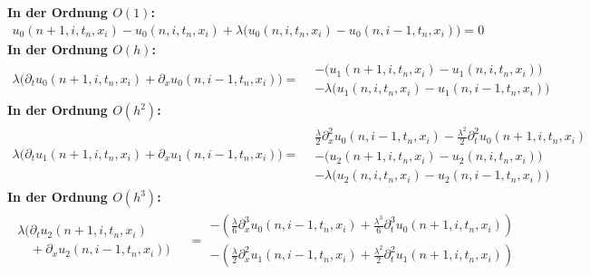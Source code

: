 \vspace{0.4cm}
\noindent \textbf{In der Ordnung $O(1)$:}
\begin{align}\label{eq:transport:diskret:o1}
u_0(n+1, i, t_n, x_i) - u_0(n, i, t_n, x_i)
+ \lambda \bigl(u_0(n, i, t_n, x_i) - u_0(n, i-1, t_n, x_i) \bigr) = 0
\end{align}
\vspace{0.4cm}
\noindent \textbf{In der Ordnung $O(h)$:}
\begin{align}\label{eq:transport:diskret:oh}
\lambda \bigl( \partial_t u_0(n+1, i, t_n, x_i) + \partial_x u_0(n, i-1, t_n, x_i) \bigr) =
\begin{split}
&- \bigl( u_1(n+1, i, t_n, x_i) - u_1(n, i, t_n, x_i) \bigr)\\
&- \lambda \bigl(u_1(n, i, t_n, x_i) - u_1(n, i-1, t_n, x_i) \bigr)
\end{split}
\end{align}
\vspace{0.4cm}
\noindent \textbf{In der Ordnung $O(h^2)$:}
\begin{align}\label{eq:transport:diskret:oh2}
\lambda \bigl( \partial_t u_1(n+1, i, t_n, x_i) + \partial_x u_1(n, i-1, t_n, x_i) \bigr) =
\begin{split}
&\frac {\lambda}{2} \partial^2_x u_0(n, i-1, t_n, x_i) - \frac{\lambda^2}{2} \partial^2_t u_0(n+1, i, t_n, x_i)\\
&- \bigl( u_2(n+1, i, t_n, x_i) - u_2(n, i, t_n, x_i) \bigr)\\
&- \lambda \bigl(u_2(n, i, t_n, x_i) - u_2(n, i-1, t_n, x_i) \bigr)
\end{split}
\end{align}
\vspace{0.4cm}
\noindent \textbf{In der Ordnung $O(h^3)$:}
\begin{align}\label{eq:transport:diskret:oh3}
\begin{split}
\lambda \bigl(\partial_t u_2(n+1, i, t_n, x_i)\qquad\\
\quad + \partial_x u_2(n, i-1, t_n, x_i) \bigr)
\end{split}
&= \begin{split}
- \left(\frac {\lambda}{6} \partial^3_x u_0(n, i-1, t_n, x_i) + \frac{\lambda^3}{6} \partial^3_t u_0(n+1, i, t_n, x_i)\right)\\
- \left(\frac {\lambda}{2} \partial^2_x u_1(n, i-1, t_n, x_i) + \frac{\lambda^2}{2} \partial^2_t u_1(n+1, i, t_n, x_i)\right)
\end{split}
\end{align}

